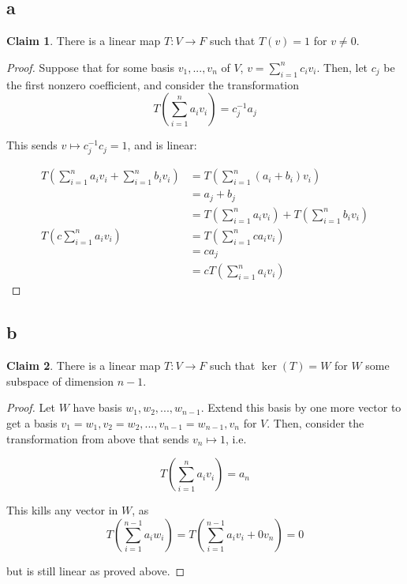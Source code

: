 \documentclass[12pt,letterpaper]{article}
\theoremstyle{definition}
\newtheorem*{claim}{Claim}
\begin{document}
\subsection*{a}

\begin{claim}
  There is a linear map $T: V \rightarrow F$ such that $T(v) = 1$ for $v \neq 0$.
\end{claim}

\begin{proof}
  Suppose that for some basis $v_1, ..., v_n$ of $V$, $v = \sum_{i=1}^n c_iv_i$.
  Then, let $c_j$ be the first nonzero coefficient, and consider the
  transformation
  \[
    T(\sum_{i=1}^na_iv_i) = c_j^{-1}a_j
  \]

  This sends $v \mapsto c_j^{-1}c_j = 1$, and is linear:

  \begin{align*}
    T(\sum_{i=1}^na_iv_i + \sum_{i=1}^nb_iv_i) &= T(\sum_{i=1}^n(a_i+b_i)v_i) \\
                                               &= a_j + b_j \\
                                               &= T(\sum_{i=1}^na_iv_i) + T(\sum_{i=1}^nb_iv_i) \\
    T(c\sum_{i=1}^na_iv_i) &= T(\sum_{i=1}^nca_iv_i) \\
                                               &= ca_j \\
                                               &= cT(\sum_{i=1}^na_iv_i)
  \end{align*}
\end{proof}

\subsection*{b}

\begin{claim}
  There is a linear map $T: V \rightarrow F$ such that $\ker(T) = W$ for $W$
  some subspace of dimension $n - 1$.
\end{claim}

\begin{proof}
  Let $W$ have basis $w_1, w_2, ..., w_{n-1}$. Extend this basis by one more
  vector to get a basis $v_1 = w_1, v_2 = w_2 , ..., v_{n-1} = w_{n-1}, v_n$ for
  $V$. Then, consider the transformation from above that sends $v_n \mapsto 1$,
  i.e. 

  \[
    T(\sum_{i=1}^n a_iv_i) = a_n
  \]

  This kills any vector in $W$, as
  \[
    T(\sum_{i=1}^{n-1} a_iw_i) = T(\sum_{i=1}^{n-1}a_iv_i + 0v_n) = 0
  \]

  but is still linear as proved above.
\end{proof}
\end{document}
